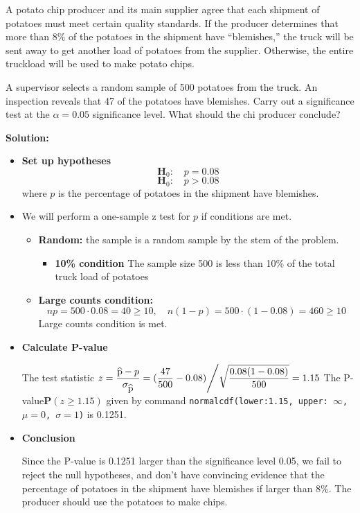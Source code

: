 \documentclass[a4paper, 12pt,twoside]{book}
\newcommand\reallywidehat[1]{%
\savestack{\tmpbox}{\stretchto{%
  \scaleto{%
    \scalerel*[\widthof{\ensuremath{#1}}]{\kern-.6pt\bigwedge\kern-.6pt}%
    {\rule[-\textheight/2]{1ex}{\textheight}}%
  }{\textheight}%
}{0.5ex}}%
\stackon[1pt]{#1}{\tmpbox}%
}
\begin{document}
\begin{itemize}
{{A potato chip producer and its main supplier agree that each shipment of potatoes must meet certain quality standards. If the producer determines that more than 8\% of the potatoes in the shipment have “blemishes,” the truck will be sent away to get another load of potatoes from the supplier. Otherwise, the entire truckload will be used to make potato chips.\vspace{0.3cm}

 A supervisor selects a random sample of 500 potatoes from the truck. An inspection reveals that 47 of the potatoes have blemishes. Carry out a significance test at the $\alpha = 0.05$ significance level.  What should the chi producer conclude?\vspace{0.3cm}
 
 \textbf{Solution:}\vspace{0.3cm}
 
 \begin{itemize}
    \item \textbf{Set up hypotheses}
        $$\textbf{H}_0:\quad p = 0.08$$
        $$\textbf{H}_0:\quad p > 0.08$$
        where $p$ is the percentage of potatoes in the shipment have blemishes.
      \item We will perform a one-sample z test for $p$ if conditions are met.
         \begin{itemize}
            \item \textbf{Random:} the sample is a random sample by the stem of the problem.
               \begin{itemize}
               \item \textbf{10\% condition} The sample size 500 is less than 10\% of the total truck load of potatoes
               \end{itemize}
              \item \textbf{Large counts condition:} 
              $$np = 500\cdot 0.08 = 40 \geq 10, \quad n(1-p) = 500\cdot(1-0.08) = 460\geq 10$$  
              Large counts condition is met.              
         \end{itemize}\vspace{0.3cm}
    
       
    \item \textbf{Calculate P-value}\vspace{0.3cm}
       
       The test statistic $\displaystyle{z= \frac{\reallywidehat{p}-p}{\sigma_{\reallywidehat{p}}} = (\frac{47}{500}-0.08)\Bigg/\sqrt{\frac{0.08(1-0.08)}{500}} = 1.15}$
       The P-value$\textbf{P}(z\geq 1.15)$ given by command \texttt{normalcdf(lower:1.15, upper: $\infty$, $\mu = 0$, $\sigma =1$)} is 0.1251.\vspace{0.3cm}
    \item \textbf{Conclusion}
    
    Since the P-value is 0.1251 larger than the significance level 0.05, we fail to reject the null hypotheses, and don't have convincing evidence that the percentage of potatoes in the shipment have blemishes if larger than 8\%. The producer should use the potatoes to make chips.
 \end{itemize} 
}}
\end{itemize}
\end{document}
